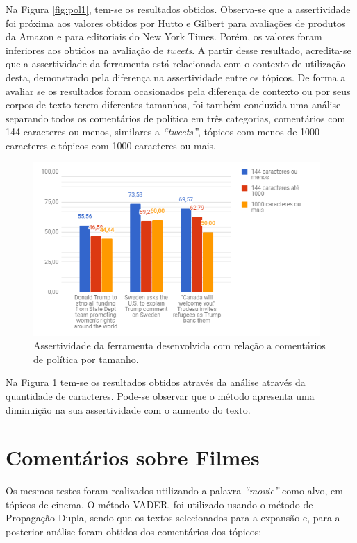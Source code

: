 Na Figura \ref{fig:pol1}, tem-se os resultados obtidos. Observa-se que
a assertividade foi próxima aos valores obtidos por Hutto e Gilbert
\cite{conf/icwsm/HuttoG14} para avaliações de produtos da Amazon e para
editoriais do New York Times. Porém, os valores foram inferiores aos obtidos na
avaliação de \textit{tweets}. A partir desse resultado, acredita-se que a
assertividade da ferramenta está relacionada com o contexto de utilização
desta, demonstrado pela diferença na assertividade entre os tópicos. De forma a
avaliar se os resultados foram ocasionados pela diferença de contexto ou por seus corpos de texto terem diferentes tamanhos, foi também conduzida uma análise separando todos os comentários de política em três categorias, comentários com 144 caracteres ou
menos, similares a \textit{``tweets''}, tópicos com menos de 1000 caracteres e
tópicos com 1000 caracteres ou mais.

\newpage
 
\begin{figure}[!htbp]
\centering
\includegraphics[height=250px]{imagens/politica2.png}
\caption{Assertividade da ferramenta desenvolvida com relação a comentários de
política por tamanho.}
\label{fig:pol2}
\end{figure}

Na Figura \ref{fig:pol2} tem-se os resultados obtidos através da
análise através da quantidade de caracteres. Pode-se observar que o método
apresenta uma diminuição na sua assertividade com o aumento do texto. 

\section{Comentários sobre Filmes}

Os mesmos testes foram realizados utilizando a palavra \textit{``movie''} como
alvo, em tópicos de cinema. O método \ac{VADER}, foi utilizado usando o método
de Propagação Dupla, sendo que os textos selecionados para a expansão e, para a
posterior análise foram obtidos dos comentários dos tópicos:

